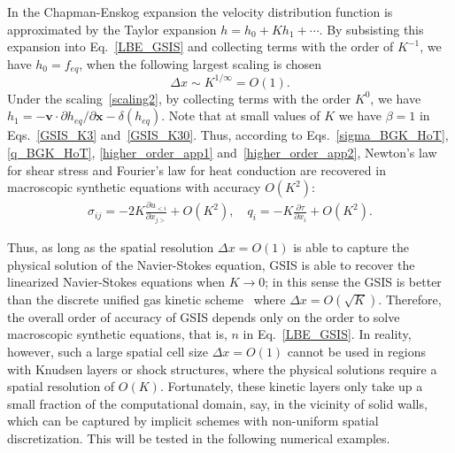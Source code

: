 



In the Chapman-Enskog expansion the velocity distribution function is approximated by the Taylor expansion
$h=h_0+Kh_1+\cdots$.
By subsisting this expansion into Eq.~\eqref{LBE_GSIS} and collecting terms with the order of $K^{-1}$, we have $h_0=f_{eq}$, when the following largest scaling is chosen
\begin{equation}\label{scaling2}
\Delta{x}\sim{K^{1/\infty}}=O(1).
\end{equation}
Under the scaling~\eqref{scaling2}, by collecting terms with the order $K^{0}$, we have
$h_1=-\bm{v}\cdot{\partial{h_{eq}}}/{\partial\bm{x}}-\delta(h_{eq})$. Note that at small values of $K$ we have $\beta=1$ in Eqs.~\eqref{GSIS_K3} and~\eqref{GSIS_K30}. 
Thus, according to Eqs.~\eqref{sigma_BGK_HoT}, \eqref{q_BGK_HoT}, \eqref{higher_order_app1} and~\eqref{higher_order_app2}, Newton's law for shear stress and Fourier's law for heat conduction are recovered in macroscopic synthetic equations with accuracy $O(K^2)$:
\begin{eqnarray}
\sigma_{ij} =-2K\frac{\partial u_{<i}}{\partial {x_{j>}}}+O(K^2), \quad
q_i =-K\frac{\partial \tau}{\partial x_i}+O(K^2).
\end{eqnarray} 


Thus, as long as the spatial resolution $\Delta{x}=O(1)$ is able to capture the physical solution of the Navier-Stokes equation, GSIS is able to recover the linearized Navier-Stokes equations when $K\rightarrow0$; in this sense the GSIS is better than the discrete unified gas kinetic scheme~\cite{Guo2019UP_arXiv} where $\Delta{x}=O(\sqrt{K})$. Therefore, the overall order of accuracy of GSIS depends only on the order to solve macroscopic synthetic equations, that is, $n$ in Eq.~\eqref{LBE_GSIS}. In reality, however, such a large spatial cell size $\Delta{x}=O(1)$ cannot be used in regions with Knudsen layers or shock structures, where the physical solutions require a spatial resolution of $O(K)$. Fortunately, these kinetic layers only take up a small fraction of the computational domain, say, in the vicinity of solid walls, which can be captured by implicit schemes with non-uniform spatial discretization. This will be tested in the following numerical examples.





